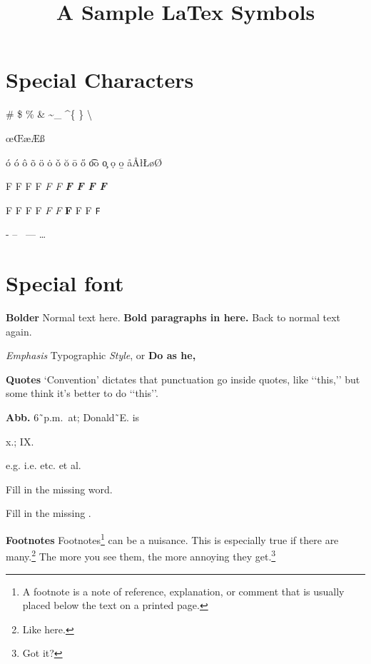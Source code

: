 \documentclass{vldb}
\begin{document}

\title{A Sample {\ttlit LaTex Symbols}}
\maketitle

\section{Special Characters}
\# \$ \% \& \textasciitilde \_ \textasciicircum \{  \} \textbackslash

\oe \OE \ae \AE \ss

\'{o} \'{o} \^{o} \~{o} \"{o} \.{o} \v{o} \u{o} \={o} \H{o} \t{oo} \c{o} \d{o} \b{o} \aa \AA \l \L \o \O %

\mdseries F \normalfont F \rmfamily F \upshape F \itshape F \slshape F \bfseries F \scshape F \sffamily F \ttfamily F

\textmd F \textnormal F \textrm F \textup F \textit F \textsl F \textbf F \textsc F \textsf F \texttt F \normalfont

\qquad - -- \, --- \textemdash \ldots

\section{Special font}

\textbf{Bolder}
Normal text here. 
{%
\bfseries
Bold paragraphs in here. 
}%
Back to normal text again.

\emph{Emphasis}
Typographic \emph{Style}, or \textbf{Do as he,} %

\textbf{Quotes}
‘Convention’ dictates that punctuation go inside quotes, like ‘‘this,’’ but some think it’s better to do ‘‘this’’.

\textbf{Abb.}
6˜p.m.\ at; Donald˜E. is %

x.; IX\@.%

e.g. i.e. etc. et al.

Fill in the missing word.

Fill in the missing \phantom{word}.

\textbf{Footnotes}
Footnotes\footnote{A footnote is a note of reference, explanation, or comment that is usually placed below the text on a printed page.} can be a nuisance. This is especially true if there are many.\footnote{Like here.} The more you see them, the more annoying they get.\footnote{Got it?}
\end{document}
